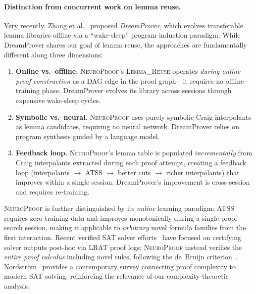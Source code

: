 \documentclass[conference]{IEEEtran}
\newcommand{\NP}{\textsc{NeuroProof}}
\newcommand{\ATSS}{\textsc{ATSS}}
\begin{document}
\paragraph{Distinction from concurrent work on lemma reuse.}
Very recently, Zhang et al.~\cite{DreamProver2026} proposed
\emph{DreamProver}, which evolves transferable lemma libraries
offline via a ``wake-sleep'' program-induction paradigm.
While DreamProver shares our goal of lemma reuse, the approaches
are fundamentally different along three dimensions:
\begin{enumerate}
  \item \textbf{Online vs.\ offline.}  \NP{}'s \textsc{Lemma\_Reuse}
    operates \emph{during online proof construction} as a DAG edge in
    the proof graph---it requires no offline training phase.  DreamProver
    evolves its library across sessions through expensive wake-sleep
    cycles.
  \item \textbf{Symbolic vs.\ neural.}  \NP{} uses purely symbolic
    Craig interpolants as lemma candidates, requiring no neural network.
    DreamProver relies on program synthesis guided by a language model.
  \item \textbf{Feedback loop.}  \NP{}'s lemma table is populated
    \emph{incrementally} from Craig interpolants extracted during each
    proof attempt, creating a feedback loop (interpolants $\to$ ATSS
    $\to$ better cuts $\to$ richer interpolants) that improves
    within a single session.  DreamProver's improvement is
    cross-session and requires re-training.
\end{enumerate}

\noindent
\NP{} is further distinguished by its \emph{online} learning paradigm:
\ATSS{} requires zero training data and improves monotonically during
a single proof-search session, making it applicable to \emph{arbitrary}
novel formula families from the first interaction.  Recent verified
SAT solver efforts~\cite{LammichLRAT2024,FleuryVerifiedSAT2025}
have focused on certifying solver outputs post-hoc via LRAT proof
logs; \NP{} instead verifies the \emph{entire proof calculus}
including novel rules, following the de~Bruijn
criterion~\cite{Harrison2009}.  Nordstr\"{o}m~\cite{NordstromProofComplexity2025}
provides a contemporary survey connecting proof complexity to modern
SAT solving, reinforcing the relevance of our complexity-theoretic
analysis.
\end{document}
